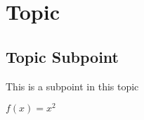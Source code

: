 \documentclass{article}
\date{2013-09-01}
\author{John Doe}
\begin{document}
\maketitle
{}
\section{Topic} {
  \subsection{Topic Subpoint} {
	  This is a subpoint in this topic
  }

  $f(x) = x^2$
 }
\end{document}
